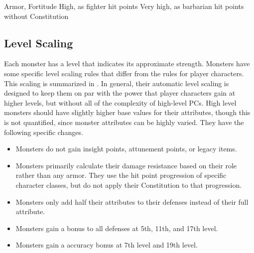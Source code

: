         Armor,  Fortitude
       High, as fighter hit points
       Very high, as barbarian hit points without Constitution

  \subsection{Level Scaling}
    Each monster has a level that indicates its approximate strength.
    Monsters have some specific level scaling rules that differ from the rules for player characters.
    This scaling is summarized in .
    In general, their automatic level scaling is designed to keep them on par with the power that player characters gain at higher levels, but without all of the complexity of high-level PCs.
    High level monsters should have slightly higher base values for their attributes, though this is not quantified, since monster attributes can be highly varied.
    They have the following specific changes.
    \begin{itemize}
      \item Monsters do not gain insight points, attunement points, or legacy items.
      \item Monsters primarily calculate their damage resistance based on their role rather than any armor.
        They use the hit point progression of specific character classes, but do not apply their Constitution to that progression.
      \item Monsters only add half their attributes to their defenses instead of their full attribute.
      \item Monsters gain a  bonus to all defenses at 5th, 11th, and 17th level.
      \item Monsters gain a  accuracy bonus at 7th level and 19th level.
    \end{itemize}

